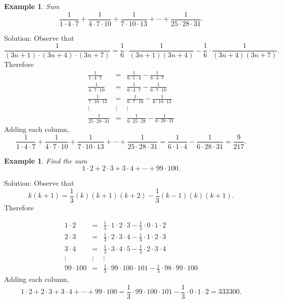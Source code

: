 \documentclass[11pt, openany]{book}
\theoremstyle{change} \theoremheaderfont{\blue\sffamily\bfseries}
\newtheorem{exa}[thm]{Example}
\theoremstyle{nonumberplain} \theoremheaderfont{\sffamily\bfseries}
\newcommand{\í}{\'{\i}}
\begin{document}
\begin{exa} Sum
$$ \frac{1}{1\cdot 4\cdot 7} + \frac{1}{4\cdot 7\cdot 10} + \frac{1}{7\cdot 10 \cdot 13} + \cdots + \frac{1}{25\cdot 28\cdot 31}.$$
\end{exa}
Solution: Observe that
$$ \frac{1}{(3n + 1)\cdot (3n + 4)\cdot (3n + 7)} = \frac{1}{6}\cdot \frac{1}{(3n + 1)(3n + 4)} - \frac{1}{6}\cdot\frac{1}{(3n + 4)(3n + 7)}.$$
Therefore
$$
\begin{array}{lcl}
\frac{1}{1\cdot 4\cdot 7} & = & \frac{1}{6\cdot 1\cdot 4} - \frac{1}{6\cdot 4\cdot 7} \\
\frac{1}{4\cdot 7\cdot 10} & =  &\frac{1}{6\cdot 4\cdot 7} - \frac{1}{6\cdot 7\cdot 10} \\
\frac{1}{7\cdot 10\cdot 13} & =  &\frac{1}{6\cdot 7\cdot 10} - \frac{1}{6\cdot 10\cdot 13} \\

\vdots & \vdots & \vdots \\
\frac{1}{25\cdot 28\cdot 31} & =  &\frac{1}{6\cdot 25\cdot 28} -
\frac{1}{6\cdot 28\cdot 31}
\end{array}
$$
Adding each column,
$$ \frac{1}{1\cdot 4\cdot 7} + \frac{1}{4\cdot 7\cdot 10} + \frac{1}{7\cdot 10 \cdot 13} + \cdots
+ \frac{1}{25\cdot 28\cdot 31} = \frac{1}{6\cdot 1\cdot 4} -
\frac{1}{6\cdot 28\cdot 31} = \frac{9}{217}.$$
\begin{exa} Find the sum
$$ 1\cdot 2 + 2\cdot 3 + 3\cdot 4 + \cdots + 99\cdot 100.$$ \end{exa}
Solution: Observe that
$$ k(k + 1) = \frac{1}{3}(k)(k + 1)(k + 2) - \frac{1}{3}(k - 1)(k)(k + 1).$$Therefore

$$
\begin{array}{lcl}
1\cdot 2 & = &  \frac{1}{3}\cdot 1\cdot 2 \cdot 3 - \frac{1}{3}\cdot 0\cdot 1\cdot 2 \\
2\cdot 3 & = &  \frac{1}{3}\cdot 2\cdot 3 \cdot 4 - \frac{1}{3}\cdot 1\cdot 2\cdot 3 \\
3\cdot 4 & = &  \frac{1}{3}\cdot 3\cdot  4\cdot 5 - \frac{1}{3}\cdot 2\cdot 3\cdot 4 \\
\vdots & \vdots & \vdots \\
99\cdot 100 & = &  \frac{1}{3}\cdot 99\cdot 100 \cdot 101 -
\frac{1}{3}\cdot 98\cdot 99\cdot 100
\end{array}
$$
Adding each column,
$$1\cdot 2 + 2\cdot 3 + 3\cdot 4 + \cdots + 99\cdot 100 = \frac{1}{3}\cdot 99\cdot
100\cdot 101 - \frac{1}{3}\cdot 0\cdot 1\cdot 2 = 333300.$$
\end{document}

